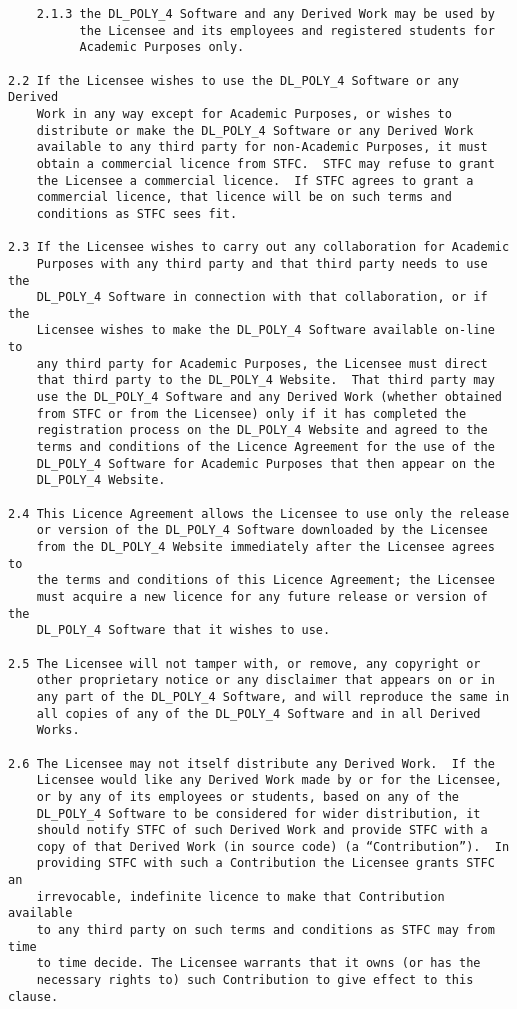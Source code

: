 \begin{verbatim}
    2.1.3 the DL_POLY_4 Software and any Derived Work may be used by
          the Licensee and its employees and registered students for
          Academic Purposes only.

2.2 If the Licensee wishes to use the DL_POLY_4 Software or any Derived
    Work in any way except for Academic Purposes, or wishes to
    distribute or make the DL_POLY_4 Software or any Derived Work
    available to any third party for non-Academic Purposes, it must
    obtain a commercial licence from STFC.  STFC may refuse to grant
    the Licensee a commercial licence.  If STFC agrees to grant a
    commercial licence, that licence will be on such terms and
    conditions as STFC sees fit.

2.3 If the Licensee wishes to carry out any collaboration for Academic
    Purposes with any third party and that third party needs to use the
    DL_POLY_4 Software in connection with that collaboration, or if the
    Licensee wishes to make the DL_POLY_4 Software available on-line to
    any third party for Academic Purposes, the Licensee must direct
    that third party to the DL_POLY_4 Website.  That third party may
    use the DL_POLY_4 Software and any Derived Work (whether obtained
    from STFC or from the Licensee) only if it has completed the
    registration process on the DL_POLY_4 Website and agreed to the
    terms and conditions of the Licence Agreement for the use of the
    DL_POLY_4 Software for Academic Purposes that then appear on the
    DL_POLY_4 Website.

2.4 This Licence Agreement allows the Licensee to use only the release
    or version of the DL_POLY_4 Software downloaded by the Licensee
    from the DL_POLY_4 Website immediately after the Licensee agrees to
    the terms and conditions of this Licence Agreement; the Licensee
    must acquire a new licence for any future release or version of the
    DL_POLY_4 Software that it wishes to use.

2.5 The Licensee will not tamper with, or remove, any copyright or
    other proprietary notice or any disclaimer that appears on or in
    any part of the DL_POLY_4 Software, and will reproduce the same in
    all copies of any of the DL_POLY_4 Software and in all Derived
    Works.

2.6 The Licensee may not itself distribute any Derived Work.  If the
    Licensee would like any Derived Work made by or for the Licensee,
    or by any of its employees or students, based on any of the
    DL_POLY_4 Software to be considered for wider distribution, it
    should notify STFC of such Derived Work and provide STFC with a
    copy of that Derived Work (in source code) (a “Contribution”).  In
    providing STFC with such a Contribution the Licensee grants STFC an
    irrevocable, indefinite licence to make that Contribution available
    to any third party on such terms and conditions as STFC may from time
    to time decide. The Licensee warrants that it owns (or has the
    necessary rights to) such Contribution to give effect to this clause.


\end{verbatim}
